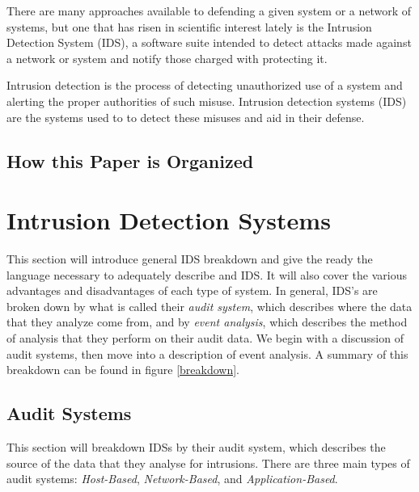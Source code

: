 \documentclass{acm_proc_article-sp}
\begin{document}
	There are many approaches available to defending a given system or a network of systems, but one that has risen in scientific interest lately is the Intrusion Detection System (IDS), a software suite intended to detect attacks made against a network or system and notify those charged with protecting it.
	
	Intrusion detection is the process of detecting unauthorized use of a system and alerting the proper authorities of such misuse. Intrusion detection systems (IDS) are the systems used to to detect these misuses and aid in their defense. 
    \subsection{How this Paper is Organized}
    	
\section{Intrusion Detection Systems}
    This section will introduce general IDS breakdown and give the ready the language necessary to adequately describe and IDS. It will also cover the various advantages and disadvantages of each type of system. In general, IDS's are broken down by what is called their \emph{audit system}, which describes where the data that they analyze come from, and by \emph{event analysis}, which describes the method of analysis that they perform on their audit data. We begin with a discussion of audit systems, then move into a description of event analysis. A summary of this breakdown can be found in figure \ref{breakdown}.

    \subsection{Audit Systems}
    	This section will breakdown IDSs by their audit system, which describes the source of the data that they analyse for intrusions. There are three main types of audit systems: \emph{Host-Based}, \emph{Network-Based}, and \emph{Application-Based}.
\end{document}
